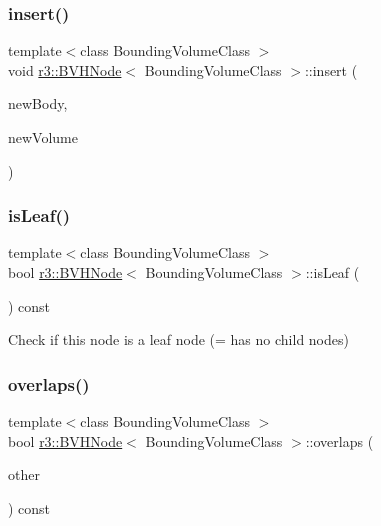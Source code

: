 \subsubsection{\texorpdfstring{insert()}{insert()}}
{\footnotesize\ttfamily template$<$class Bounding\+Volume\+Class $>$ \\
void \mbox{\hyperlink{classr3_1_1_b_v_h_node}{r3\+::\+B\+V\+H\+Node}}$<$ Bounding\+Volume\+Class $>$\+::insert (\begin{DoxyParamCaption}\item[{\mbox{\hyperlink{classr3_1_1_rigid_body}{Rigid\+Body}} $\ast$}]{new\+Body,  }\item[{const Bounding\+Volume\+Class \&}]{new\+Volume }\end{DoxyParamCaption})\hspace{0.3cm}{\ttfamily [protected]}}

\mbox{\label{classr3_1_1_b_v_h_node_a517b40f1a91cda371b3cb786f1c7e155}} 
\subsubsection{\texorpdfstring{is\+Leaf()}{isLeaf()}}
{\footnotesize\ttfamily template$<$class Bounding\+Volume\+Class $>$ \\
bool \mbox{\hyperlink{classr3_1_1_b_v_h_node}{r3\+::\+B\+V\+H\+Node}}$<$ Bounding\+Volume\+Class $>$\+::is\+Leaf (\begin{DoxyParamCaption}{ }\end{DoxyParamCaption}) const}

Check if this node is a leaf node (= has no child nodes) \mbox{\label{classr3_1_1_b_v_h_node_a69ec6f958bbe07629cd979599532dfd8}} 
\subsubsection{\texorpdfstring{overlaps()}{overlaps()}}
{\footnotesize\ttfamily template$<$class Bounding\+Volume\+Class $>$ \\
bool \mbox{\hyperlink{classr3_1_1_b_v_h_node}{r3\+::\+B\+V\+H\+Node}}$<$ Bounding\+Volume\+Class $>$\+::overlaps (\begin{DoxyParamCaption}\item[{\mbox{\hyperlink{classr3_1_1_b_v_h_node}{B\+V\+H\+Node}}$<$ Bounding\+Volume\+Class $>$ $\ast$}]{other }\end{DoxyParamCaption}) const\hspace{0.3cm}{\ttfamily [protected]}}

